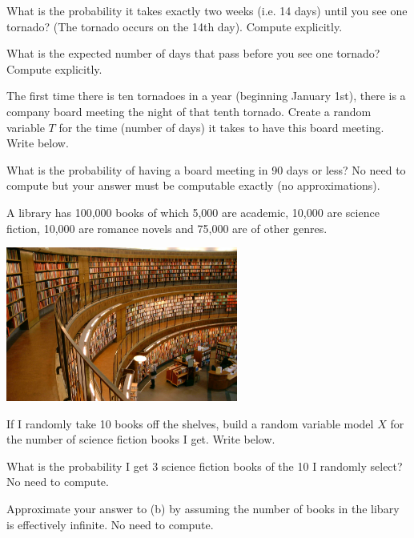 \documentclass[12pt]{article}
\begin{document}
 What is the probability it takes exactly two weeks (i.e. 14 days) until you see one tornado? (The tornado occurs on the 14th day). Compute explicitly. 

 What is the expected number of days that pass before you see one tornado? Compute explicitly. 

 The first time there is ten tornadoes in a year (beginning January 1st), there is a company board meeting the night of that tenth tornado. Create a random variable $T$ for the time (number of days) it takes to have this board meeting. Write  below.  

 What is the probability of having a board meeting in 90 days or less? No need to compute but your answer must be computable exactly (no approximations). 

\eenum


\problem A library has 100,000 books of which 5,000 are academic, 10,000 are science fiction, 10,000 are romance novels and 75,000 are of other genres.

\begin{center}
\includegraphics[width=3in]{library.jpg}
\end{center}

\benum

 If I randomly take 10 books off the shelves, build a random variable model $X$ for the number of science fiction books I get. Write  below. 


 What is the probability I get 3 science fiction books of the 10 I randomly select? No need to compute. 


 Approximate your answer to (b) by assuming the number of books in the libary is effectively infinite. No need to compute.


\eenum
\end{document}
